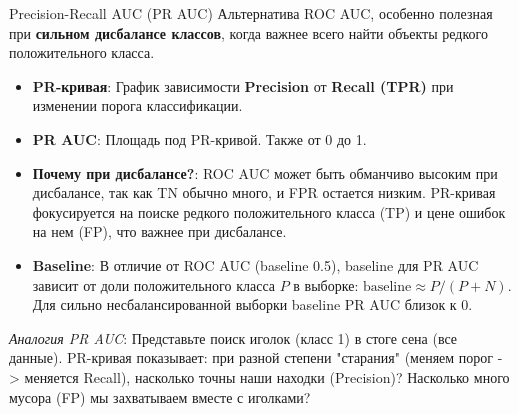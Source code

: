 \begin{myexampleblock}{Precision-Recall AUC (PR AUC)}
    Альтернатива ROC AUC, особенно полезная при \textbf{сильном дисбалансе классов}, когда важнее всего найти объекты редкого положительного класса.
    \begin{itemize}
        \item \textbf{PR-кривая}: График зависимости \textbf{Precision} от \textbf{Recall (TPR)} при изменении порога классификации.
        \item \textbf{PR AUC}: Площадь под PR-кривой. Также от 0 до 1.
        \item \textbf{Почему при дисбалансе?}: ROC AUC может быть обманчиво высоким при дисбалансе, так как TN обычно много, и FPR остается низким. PR-кривая фокусируется на поиске редкого положительного класса (TP) и цене ошибок на нем (FP), что важнее при дисбалансе.
        \item \textbf{Baseline}: В отличие от ROC AUC (baseline 0.5), baseline для PR AUC зависит от доли положительного класса $P$ в выборке: $\text{baseline} \approx P/(P+N)$. Для сильно несбалансированной выборки baseline PR AUC близок к 0.
    \end{itemize}
    \textit{Аналогия PR AUC}: Представьте поиск иголок (класс 1) в стоге сена (все данные). PR-кривая показывает: при разной степени "старания" (меняем порог -> меняется Recall), насколько точны наши находки (Precision)? Насколько много мусора (FP) мы захватываем вместе с иголками?

    \begin{center} %
    \end{center}
\end{myexampleblock}

